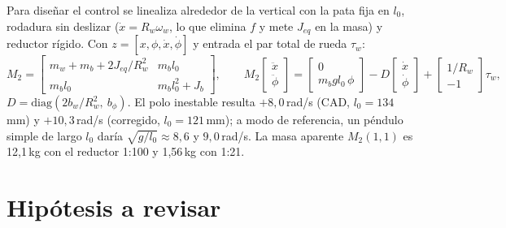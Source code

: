 \documentclass[11pt,a4paper]{article}
\begin{document}
Para diseñar el control se linealiza alrededor de la vertical con la pata fija en $l_0$, rodadura
sin deslizar ($\dot x = R_w\omega_w$, lo que elimina $f$ y mete $J_{eq}$ en la masa) y reductor
rígido. Con $z = [x, \phi, \dot x, \dot\phi]$ y entrada el par total de rueda $\tau_w$:
\begin{equation}
  M_2 = \begin{bmatrix} m_w + m_b + 2J_{eq}/R_w^2 & m_b l_0 \\ m_b l_0 & m_b l_0^2 + J_b \end{bmatrix},\qquad
  M_2\begin{bmatrix}\ddot x\\ \ddot\phi\end{bmatrix} = \begin{bmatrix} 0 \\ m_b g l_0\,\phi\end{bmatrix} - D\begin{bmatrix}\dot x\\ \dot\phi\end{bmatrix} + \begin{bmatrix} 1/R_w \\ -1\end{bmatrix}\tau_w,
\end{equation}
$D = \mathrm{diag}(2b_w/R_w^2,\ b_\phi)$. El polo inestable resulta $+8{,}0$\,rad/s (CAD, $l_0 = 134$\,mm) y
$+10{,}3$\,rad/s (corregido, $l_0 = 121$\,mm); a modo de referencia, un péndulo simple de largo $l_0$
daría $\sqrt{g/l_0} \approx 8{,}6$ y $9{,}0$\,rad/s. La masa aparente $M_2(1,1)$ es 12{,}1\,kg con el
reductor 1:100 y 1{,}56\,kg con 1:21.

\section{Hipótesis a revisar}
\end{document}

